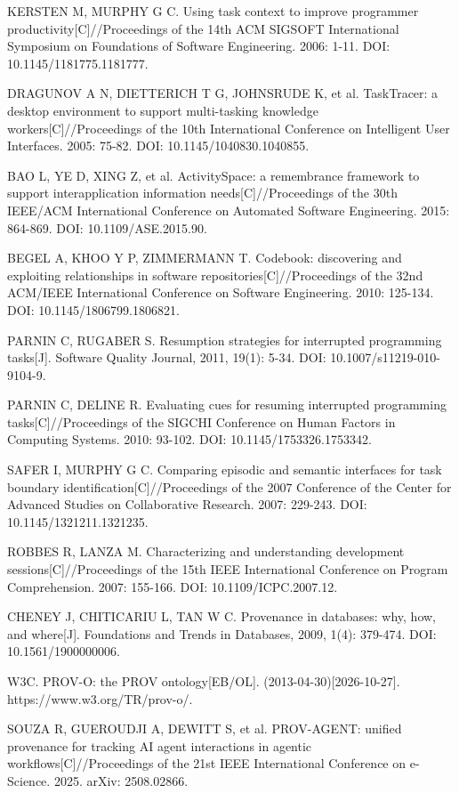 {\begin{tjreflist}
\item KERSTEN M, MURPHY G C. Using task context to improve programmer productivity[C]//Proceedings of the 14th ACM SIGSOFT International Symposium on Foundations of Software Engineering. 2006: 1-11. DOI: 10.1145/1181775.1181777.
\item DRAGUNOV A N, DIETTERICH T G, JOHNSRUDE K, et al. TaskTracer: a desktop environment to support multi-tasking knowledge workers[C]//Proceedings of the 10th International Conference on Intelligent User Interfaces. 2005: 75-82. DOI: 10.1145/1040830.1040855.
\item BAO L, YE D, XING Z, et al. ActivitySpace: a remembrance framework to support interapplication information needs[C]//Proceedings of the 30th IEEE/ACM International Conference on Automated Software Engineering. 2015: 864-869. DOI: 10.1109/ASE.2015.90.
\item BEGEL A, KHOO Y P, ZIMMERMANN T. Codebook: discovering and exploiting relationships in software repositories[C]//Proceedings of the 32nd ACM/IEEE International Conference on Software Engineering. 2010: 125-134. DOI: 10.1145/1806799.1806821.
\item PARNIN C, RUGABER S. Resumption strategies for interrupted programming tasks[J]. Software Quality Journal, 2011, 19(1): 5-34. DOI: 10.1007/s11219-010-9104-9.
\item PARNIN C, DELINE R. Evaluating cues for resuming interrupted programming tasks[C]//Proceedings of the SIGCHI Conference on Human Factors in Computing Systems. 2010: 93-102. DOI: 10.1145/1753326.1753342.
\item SAFER I, MURPHY G C. Comparing episodic and semantic interfaces for task boundary identification[C]//Proceedings of the 2007 Conference of the Center for Advanced Studies on Collaborative Research. 2007: 229-243. DOI: 10.1145/1321211.1321235.
\item ROBBES R, LANZA M. Characterizing and understanding development sessions[C]//Proceedings of the 15th IEEE International Conference on Program Comprehension. 2007: 155-166. DOI: 10.1109/ICPC.2007.12.
\item CHENEY J, CHITICARIU L, TAN W C. Provenance in databases: why, how, and where[J]. Foundations and Trends in Databases, 2009, 1(4): 379-474. DOI: 10.1561/1900000006.
\item W3C. PROV-O: the PROV ontology[EB/OL]. (2013-04-30)[2026-10-27]. https://www.w3.org/TR/prov-o/.
\item SOUZA R, GUEROUDJI A, DEWITT S, et al. PROV-AGENT: unified provenance for tracking AI agent interactions in agentic workflows[C]//Proceedings of the 21st IEEE International Conference on e-Science. 2025. arXiv: 2508.02866.

\end{tjreflist}}
